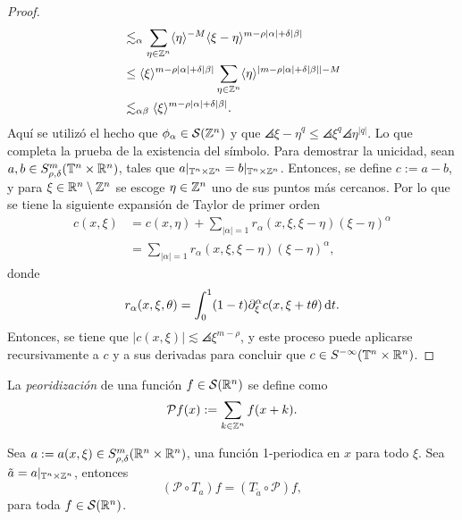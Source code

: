 \begin{proof}
\begin{align*}
		& \lesssim_{\alpha} \sum_{\eta\in\mathbb{Z}^n} \langle\eta\rangle^{-M}  \langle\xi-\eta\rangle^{m-\rho|\alpha|+\delta|\beta|}  \\
		& \leq \langle\xi\rangle^{m-\rho|\alpha|+\delta|\beta|} \sum_{\eta\in\mathbb{Z}^n} \langle\eta\rangle^{|m-\rho|\alpha|+\delta|\beta|| - M} \\
		& \lesssim_{\alpha\beta} \langle\xi\rangle^{m-\rho|\alpha|+\delta|\beta|}.
	\end{align*}
	Aquí se utilizó el hecho que $\phi_\alpha\in\mathcal{S}(\mathbb{Z}^n)$ y que $\angles{\xi-\eta}^q \leq \angles{\xi}^q \angles{\eta}^{|q|}$. Lo que completa la prueba de la existencia del símbolo. Para demostrar la unicidad, sean $a,b\in S^m_{\rho,\delta}(\mathbb{T}^n\times\mathbb{R}^n)$, tales que $a|_{\mathbb{T}^n\times\mathbb{Z}^n} = b|_{\mathbb{T}^n\times\mathbb{Z}^n}$. Entonces, se define $c:=a-b$, y para $\xi\in\mathbb{R}^n\setminus\mathbb{Z}^n$ se escoge $\eta\in\mathbb{Z}^n$ uno de sus puntos más cercanos. Por lo que se tiene la siguiente expansión de Taylor de primer orden
	\begin{align*}
		c(x, \xi) & = c(x, \eta) + \sum_{|\alpha|=1} r_\alpha(x, \xi, \xi-\eta)(\xi-\eta)^\alpha \\
		& = \sum_{|\alpha|=1} r_\alpha(x, \xi, \xi-\eta)(\xi-\eta)^\alpha,
	\end{align*}
	donde
	\begin{equation*}
		r_\alpha(x, \xi, \theta) = \int_0^1(1-t)\partial^\alpha_\xi c(x, \xi+t\theta)\mathop{}\!\mathrm{d} t.
	\end{equation*}
	Entonces, se tiene que $|c(x, \xi)| \lesssim \angles{\xi}^{m-\rho}$, y este proceso puede aplicarse recursivamente a $c$ y a sus derivadas para concluir que $c\in S^{-\infty}(\mathbb{T}^n\times\mathbb{R}^n)$.
\end{proof}
\begin{definition}[Periodización]
	La \textit{peoridización} de una función $f\in\mathcal{S}(\mathbb{R}^n)$ se define como
	\begin{equation*}
		\mathcal{P}f(x):= \sum_{k\in\mathbb{Z}^n} f(x + k).
	\end{equation*}
\end{definition}
\begin{theorem}
	Sea $a:=a(x, \xi)\in S^m_{\rho, \delta}(\mathbb{R}^n\times\mathbb{R}^n)$, una función 1-periodica en $x$ para todo $\xi$. Sea $\tilde{a}=a|_{\mathbb{T}^n\times\mathbb{Z}^n}$, entonces 
	\begin{equation*}
		(\mathcal{P}\circ T_a) f = (T_{\tilde{a}}\circ \mathcal{P})f,
	\end{equation*}
	para toda $f\in\mathcal{S}(\mathbb{R}^n)$.
\end{theorem}
